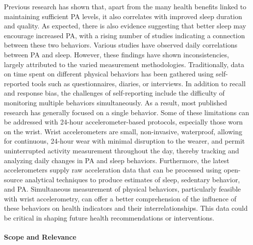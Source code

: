 \documentclass[
  10pt,
  letterpaper,
  DIV=11,
  numbers=noendperiod]{scrartcl}
\let\oldparagraph\paragraph
\renewcommand{\paragraph}[1]{\oldparagraph{#1}\mbox{}}
\begin{document}
Previous research has shown that, apart from the many health benefits
linked to maintaining sufficient PA levels, it also correlates with
improved sleep duration and
quality\autocite{kredlowEffectsPhysicalActivity2015}. As expected, there
is also evidence suggesting that better sleep may encourage increased
PA\autocite{lambiaseTemporalRelationshipsPhysical2013,mcglincheyPhysicalActivitySleep2014},
with a rising number of studies indicating a connection between these
two
behaviors\autocite{dolezalInterrelationshipSleepExercise2017,chennaouiSleepExerciseReciprocal2015}.
Various studies have observed daily correlations between PA and
sleep\autocite{petteegabrielBidirectionalAssociationsAccelerometerdetermined2017,kishidaIntensiveLongitudinalExamination2016}.
However, these findings have shown inconsistencies, largely attributed
to the varied measurement methodologies. Traditionally, data on time
spent on different physical behaviors has been gathered using
self-reported tools such as questionnaires, diaries, or
interviews\autocite{dowdSystematicLiteratureReview2018}. In addition to
recall and response bias, the challenges of self-reporting include the
difficulty of monitoring multiple behaviors
simultaneously\autocite{rosenberger24HourActivityCycle2019}. As a
result, most published research has generally focused on a single
behavior. Some of these limitations can be addressed with 24-hour
accelerometer-based protocols, especially those worn on the
wrist\autocite{rosenberger24HourActivityCycle2019}. Wrist accelerometers
are small, non-invasive,
waterproof\autocite{welkReliabilityAccelerometrybasedActivity2004},
allowing for continuous, 24-hour wear with minimal disruption to the
wearer, and permit uninterrupted activity measurement throughout the
day, thereby tracking and analyzing daily changes in PA and sleep
behaviors. Furthermore, the latest accelerometers supply raw
acceleration data that can be processed using open-source analytical
techniques to produce estimates of sleep, sedentary behavior, and
PA\autocite{miguelesComparabilityAccelerometerSignal2019}. Simultaneous
measurement of physical behaviors, particularly feasible with wrist
accelerometry, can offer a better comprehension of the influence of
these behaviors on health indicators and their interrelationships. This
data could be critical in shaping future health recommendations or
interventions.

\hypertarget{scope-and-relevance}{%
\paragraph{Scope and Relevance}\label{scope-and-relevance}}
\end{document}
